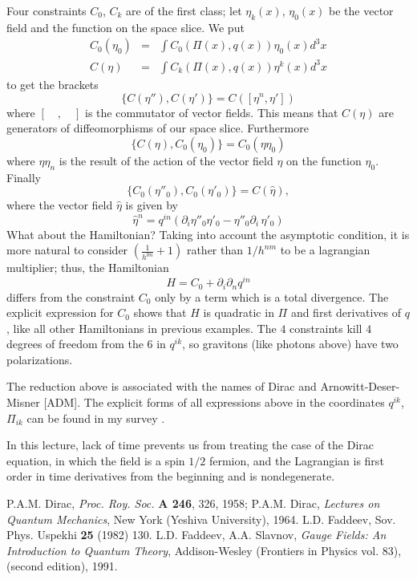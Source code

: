 Four constraints $C_0$, $C_k$ are of the first class;
let $\eta_k(x)$, $\eta_0(x)$ be the vector field and the 
function on the space slice.
We put
\begin{eqnarray*}
C_0(\eta_0) &=& \int C_0(\Pi(x),q(x))\eta_0(x)d^3 x\\
C(\eta) &=& \int C_k(\Pi(x),q(x))\eta^k(x)d^3x
\end{eqnarray*}
to get the brackets
$$
\{C(\eta''),C(\eta')\}=
C([\eta^n,\eta'])
$$
where $[\quad,\quad]$ is the commutator of vector
fields.
This means that $C(\eta)$ are generators of
diffeomorphisms of our space slice.
Furthermore
$$
\{C(\eta),C_0(\eta_0)\}=
C_0(\eta\eta_0)
$$
where $\eta\eta_n$ is the  result of the action of the vector
field $\eta$ on the function $\eta_0$.
Finally
$$
\{C_0(\eta''_0),C_0(\eta'_0)\}=
C(\hat{\eta}),
$$
where the vector field $\hat{\eta}$ is given by
$$
\hat{\eta}^n=q^{in}(\partial_i 
\eta''_0\eta'_0-\eta''_0\partial_i \,
\eta'_0)
$$
What about the Hamiltonian?
Taking into account the asymptotic condition, it is
more natural to consider
$\left(\frac{1}{h^{0n}}+1\right)$ rather than
$1/h^{nm}$ to be a lagrangian multiplier; thus, the
Hamiltonian
$$
H=C_0 + \partial_i \partial_n q^{in}
$$
differs from the constraint $C_{0}$ only by  a term  which is a 
total divergence.
The explicit expression for $C_0$ shows that $H$ is
quadratic in $\Pi$ and first derivatives of $q$, like  all 
other Hamiltonians in previous examples.
The $4$ constraints kill $4$ degrees of freedom from the 6
in $q^{ik}$, so gravitons (like photons above) have two
polarizations.

The reduction above is associated with the names
of Dirac  and Arnowitt-Deser-Misner [ADM].
The explicit forms of all expressions above in the
coordinates $q^{ik}$, $\Pi_{ik}$ can be found in my
survey \cite{F:grav}.



In this lecture, lack of time prevents us from 
treating   the case of the Dirac equation,
in which the field is  a spin $1/2$ fermion, and the Lagrangian is 
first order in time derivatives from the beginning and is nondegenerate.







\begin{thebibliography}{99}
 P.A.M.  Dirac, {\em Proc. Roy. Soc.} {\bf A 246}, 
326, 1958; P.A.M. Dirac, {\em Lectures on Quantum Mechanics}, New York
(Yeshiva University), 1964. 
 L.D. Faddeev, Sov. Phys. Uspekhi {\bf 25} (1982) %
130.
 L.D. Faddeev, A.A.  Slavnov, {\em Gauge Fields: An Introduction 
to Quantum Theory}, Addison-Wesley (Frontiers in Physics vol. 83), (second 
edition), 1991. 
\end{thebibliography}








